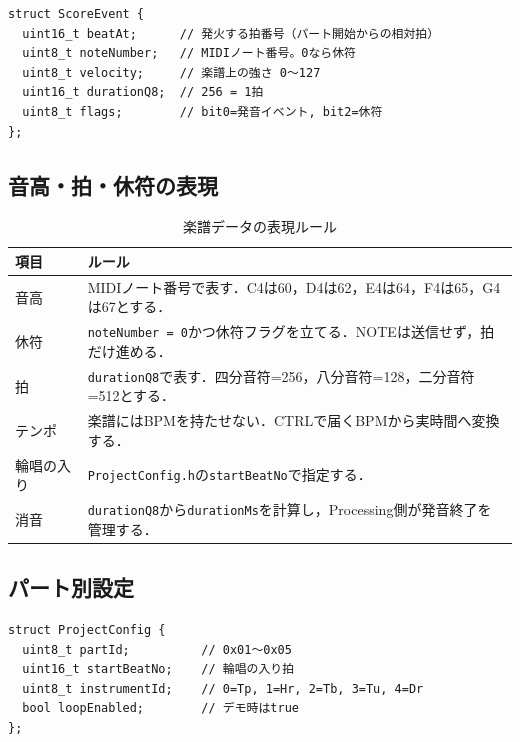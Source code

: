 \documentclass[lualatex,book,paper=a4paper,jafontsize=11.5pt,jafontscale=1.05]{jlreq}
\newcommand{\code}[1]{\texttt{#1}}
\begin{document}
\begin{verbatim}
struct ScoreEvent {
  uint16_t beatAt;      // 発火する拍番号（パート開始からの相対拍）
  uint8_t noteNumber;   // MIDIノート番号。0なら休符
  uint8_t velocity;     // 楽譜上の強さ 0〜127
  uint16_t durationQ8;  // 256 = 1拍
  uint8_t flags;        // bit0=発音イベント, bit2=休符
};
\end{verbatim}

\subsection{音高・拍・休符の表現}

\begin{table}[H]
\centering
\caption{楽譜データの表現ルール}
\label{tab:saito-notation-rule}
\begin{tabular}{p{}p{}}
\toprule
\textbf{項目} & \textbf{ルール} \\
\midrule
音高 & MIDIノート番号で表す．C4は60，D4は62，E4は64，F4は65，G4は67とする．\\
休符 & \code{noteNumber = 0}かつ休符フラグを立てる．NOTEは送信せず，拍だけ進める．\\
拍 & \code{durationQ8}で表す．四分音符=256，八分音符=128，二分音符=512とする．\\
テンポ & 楽譜にはBPMを持たせない．CTRLで届くBPMから実時間へ変換する．\\
輪唱の入り & \code{ProjectConfig.h}の\code{startBeatNo}で指定する．\\
消音 & \code{durationQ8}から\code{durationMs}を計算し，Processing側が発音終了を管理する．\\
\bottomrule
\end{tabular}
\end{table}

\subsection{パート別設定}

\begin{verbatim}
struct ProjectConfig {
  uint8_t partId;          // 0x01〜0x05
  uint16_t startBeatNo;    // 輪唱の入り拍
  uint8_t instrumentId;    // 0=Tp, 1=Hr, 2=Tb, 3=Tu, 4=Dr
  bool loopEnabled;        // デモ時はtrue
};
\end{verbatim}
\end{document}
